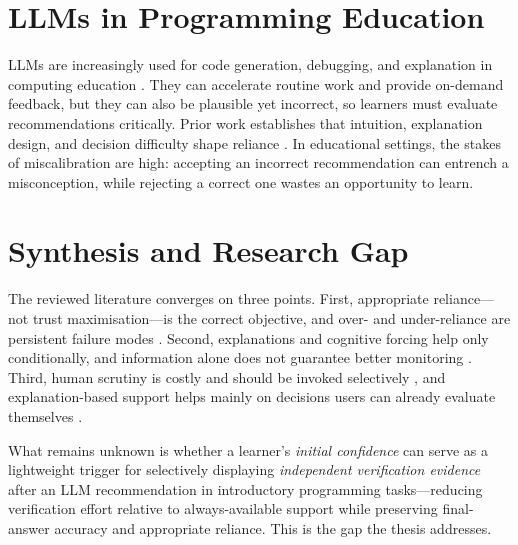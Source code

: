\documentclass[oneside,final,14pt,a4paper]{extreport}
\begin{document}
\section{LLMs in Programming Education}
\label{sec:lit-programming}

LLMs are increasingly used for code generation, debugging, and explanation in
computing education \cite{Ma2024,Cambaz2024,Denny2024}. They can accelerate
routine work and provide on-demand feedback, but they can also be plausible yet
incorrect, so learners must evaluate recommendations critically. Prior work
establishes that intuition, explanation design, and decision difficulty shape
reliance \cite{Chen2023,Vasconcelos2022,Zhang2024Verify}. In educational
settings, the stakes of miscalibration are high: accepting an incorrect
recommendation can entrench a misconception, while rejecting a correct one
wastes an opportunity to learn.

\section{Synthesis and Research Gap}
\label{sec:lit-gap}

The reviewed literature converges on three points. First, appropriate
reliance---not trust maximisation---is the correct objective, and over- and
under-reliance are persistent failure modes \cite{LeeSee2004,PoursabziSangdeh2021,
Bo2025}. Second, explanations and cognitive forcing help only conditionally,
and information alone does not guarantee better monitoring
\cite{Bucinca2021,Schemmer2022,Vasconcelos2022}. Third, human scrutiny is costly
and should be invoked selectively \cite{CascadedLM2025}, and explanation-based
support helps mainly on decisions users can already evaluate themselves
\cite{Zhang2024Verify}.

What remains unknown is whether a learner's \emph{initial confidence} can serve
as a lightweight trigger for selectively displaying \emph{independent
verification evidence} after an LLM recommendation in introductory programming
tasks---reducing verification effort relative to always-available support while
preserving final-answer accuracy and appropriate reliance. This is the gap the
thesis addresses.
\end{document}
